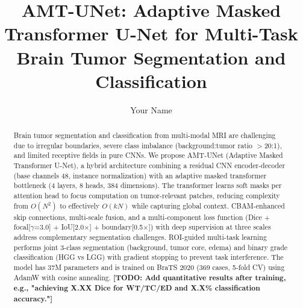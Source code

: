 \documentclass[runningheads]{llncs}
\begin{document}
%
\title{AMT-UNet: Adaptive Masked Transformer U-Net for Multi-Task Brain Tumor Segmentation and Classification}
%
%
\author{Your Name}
%
%
%
\maketitle              %
%

\begin{abstract}
Brain tumor segmentation and classification from multi-modal MRI are challenging due to irregular boundaries, severe class imbalance (background:tumor ratio $>$20:1), and limited receptive fields in pure CNNs. We propose AMT-UNet (Adaptive Masked Transformer U-Net), a hybrid architecture combining a residual CNN encoder-decoder (base channels 48, instance normalization) with an adaptive masked transformer bottleneck (4 layers, 8 heads, 384 dimensions). The transformer learns soft masks per attention head to focus computation on tumor-relevant patches, reducing complexity from $O(N^2)$ to effectively $O(kN)$ while capturing global context. CBAM-enhanced skip connections, multi-scale fusion, and a multi-component loss function (Dice + focal[$\gamma$=3.0] + IoU[2.0$\times$] + boundary[0.5$\times$]) with deep supervision at three scales address complementary segmentation challenges. ROI-guided multi-task learning performs joint 3-class segmentation (background, tumor core, edema) and binary grade classification (HGG vs LGG) with gradient stopping to prevent task interference. The model has 37M parameters and is trained on BraTS 2020 (369 cases, 5-fold CV) using AdamW with cosine annealing. \textbf{[TODO: Add quantitative results after training, e.g., "achieving X.XX Dice for WT/TC/ED and X.X\% classification accuracy."]}

\end{abstract}
%
%
%







%
%
%


\end{document}
